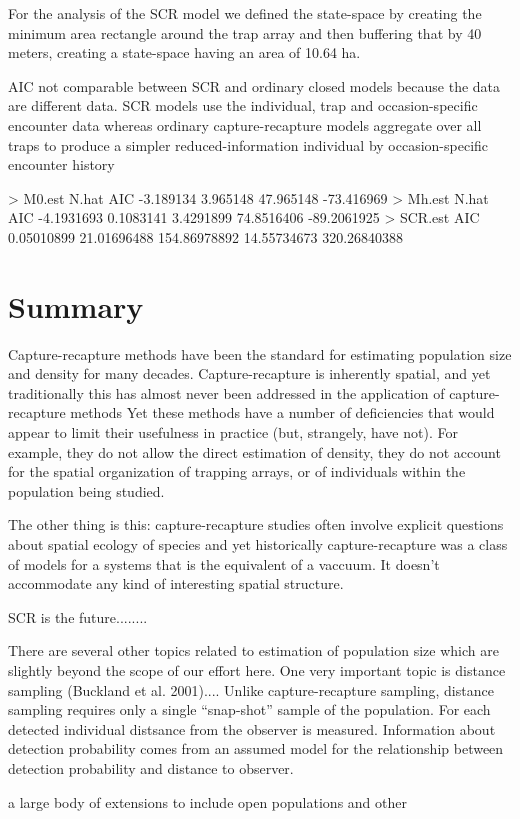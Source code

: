 \documentclass{book}
\begin{document}
For the analysis of the SCR model we defined
 the state-space by creating the minimum area rectangle around the trap array
and then buffering that by 40 meters, creating a state-space having an
area of 10.64 ha. 


AIC not comparable between SCR and ordinary closed models because the
data are different data. SCR models use the individual, trap and occasion-specific
encounter data whereas ordinary capture-recapture models aggregate
over all traps to produce a simpler reduced-information individual by
occasion-specific encounter history


> M0.est
                           N.hat        AIC 
 -3.189134   3.965148  47.965148 -73.416969 
> Mh.est
                                          N.hat         AIC 
 -4.1931693   0.1083141   3.4291899  74.8516406 -89.2061925 
> SCR.est
                                                          AIC 
  0.05010899  21.01696488 154.86978892  14.55734673 320.26840388 






\section{Summary}

Capture-recapture methods have been the standard for estimating
population size and density for many decades. 
Capture-recapture is inherently spatial, and yet traditionally this
has almost never been addressed in the application of capture-recapture methods
 Yet these methods have
a number of deficiencies that would appear to limit their usefulness
in practice (but, strangely, have not). For example, they do not allow
the direct estimation of density, they do not account for the spatial
organization of trapping arrays, or of individuals within the
population being studied. 

The other thing is this: capture-recapture studies often involve
explicit questions about spatial ecology of species and yet
historically capture-recapture was a class of models for a systems
that is the equivalent of a vaccuum. It doesn't accommodate any kind
of interesting spatial structure.

SCR is the future........

There are several other topics related to estimation of population
size which are slightly beyond the scope of our effort here. One very
important topic is distance sampling (Buckland et al. 2001).... Unlike
capture-recapture sampling, distance sampling requires only a single
``snap-shot'' sample of the population. For each detected individual
distsance from the observer is measured.
Information about detection
probability comes from an assumed model for the relationship between
detection probability and distance to observer. 

a large body
of extensions to include open populations and other 
\end{document}
